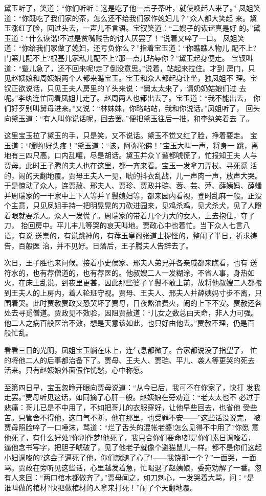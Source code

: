 黛玉听了，笑道：“你们听听：这是吃了他一点子茶叶，就使唤起人来了。”
凤姐笑道：“你既吃了我们家的茶，怎么还不给我们家作媳妇儿？”众人都大笑起
来。黛玉涨红了脸，回过头去，一声儿不言语。宝钗笑道：“二嫂子的诙谐真是好
的。”黛玉道：“什么诙谐!不过是贫嘴贱舌的讨人厌罢了！”说着又啐了一口。
凤姐笑道：“你给我们家做了媳妇，还亏负你么？”指着宝玉道：“你瞧瞧人物儿
配不上?门第儿配不上?根基儿家私儿配不上?那一点儿玷辱你？”黛玉起身便走。
宝钗叫道：“颦儿急了，还不回来呢!走了倒没意思。”说着，站起来拉住。才到
房门，只见赵姨娘和周姨娘两个人都来瞧宝玉。宝玉和众人都起身让坐，独凤姐不
理。宝钗正欲说话，只见王夫人房里的丫头来说：“舅太太来了，请奶奶姑娘们过
去呢。”李纨连忙同着凤姐儿走了。赵周两人也都出去了。宝玉道：“我不能出去，
你们好歹别叫舅母进来。”又说：“林妹妹，你略站站，我和你说话。”凤姐听了，
回头向黛玉道：“有人叫你说话呢，回去罢。”便把黛玉往后一推，和李纨笑着去
了。

这里宝玉拉了黛玉的手，只是笑，又不说话。黛玉不觉又红了脸，挣着要走。
宝玉道：“嗳哟!好头疼！”黛玉道：“该，阿弥陀佛！”宝玉大叫一声，将身一
跳，离地有三四尺高，口内乱嚷，尽是胡话。黛玉并众丫鬟都唬慌了，忙报知王夫
人与贾母。此时王子腾的夫人也在这里，都一齐来看。宝玉一发拿刀弄杖、寻死觅
活的，闹的天翻地覆。贾母王夫人一见，唬的抖衣乱战，儿一声肉一声，放声大哭。
于是惊动了众人，连贾赦、邢夫人、贾珍、贾政并琏、蓉、芸、萍、薛姨妈、薛蟠
并周瑞家的一干家中上下人等并丫鬟媳妇等，都来园内看视，登时乱麻一般。正没
个主意，只见凤姐手持一把明晃晃的刀砍进园来，见鸡杀鸡，见犬杀犬，见了人瞪
着眼就要杀人。众人一发慌了。周瑞家的带着几个力大的女人，上去抱住，夺了刀，
抬回房中。平儿丰儿等哭的哀天叫地。贾政心中也着忙。当下众人七言八语，有说
送祟的，有说跳神的，有荐玉皇阁张道士捉怪的，整闹了半日，祈求祷告，百般医
治，并不见好。日落后，王子腾夫人告辞去了。

次日，王子胜也来问候。接着小史侯家、邢夫人弟兄并各亲戚都来瞧看，也有
送符水的，也有荐僧道的，也有荐医的。他叔嫂二人一发糊涂，不省人事，身热如
火，在床上乱说。到夜里更甚，因此那些婆子丫鬟不敢上前，故将他叔嫂二人都搬
到王夫人的上房内，着人轮班守视。贾母、王夫人、邢夫人并薛姨妈寸步不离，只
围着哭。此时贾赦贾政又恐哭坏了贾母，日夜熬油费火，闹的上下不安。贾赦还各
处去寻觅僧道。贾政见不效验，因阻贾赦道：“儿女之数总由天命，非人力可强。
他二人之病百般医治不效，想是天意该如此，也只好由他去。”贾赦不理，仍是百
般忙乱。

看看三日的光阴，凤姐宝玉躺在床上，连气息都微了。合家都说没了指望了，
忙的将他二人的后事都治备下了。贾母、王夫人、贾琏、平儿、袭人等更哭的死去
活来。只有赵姨娘外面假作忧愁，心中称愿。

至第四日早，宝玉忽睁开眼向贾母说道：“从今已后，我可不在你家了，快打
发我走罢。”贾母听见这话，如同摘了心肝一般。赵姨娘在旁劝道：“老太太也不
必过于悲痛：哥儿已是不中用了，不如把哥儿的衣服穿好，让他早些回去，也省他
受些苦。只管舍不得他，这口气不断，他在那里，也受罪不安——”这些话没说完，
被贾母照脸啐了一口唾沫，骂道：“烂了舌头的混帐老婆!怎么见得不中用了?你愿
意他死了，有什么好处?你别作梦!他死了，我只合你们要命!都是你们素日调唆着，
逼他念书写字，把胆子唬破了，见了他老子就像个避猫鼠儿一样。都不是你们这起
小妇调唆的?这会子逼死了他，你们就随了心了!——我饶那一个？”一面哭，一面
骂。贾政在旁听见这些话，心里越发着急，忙喝退了赵姨娘，委宛劝解了一番。忽
有人来回：“两口棺木都做齐了。”贾母闻之，如刀刺心，一发哭着大骂，问：“是
谁叫做的棺材?快把做棺材的人拿来打死！”闹了个天翻地覆。

